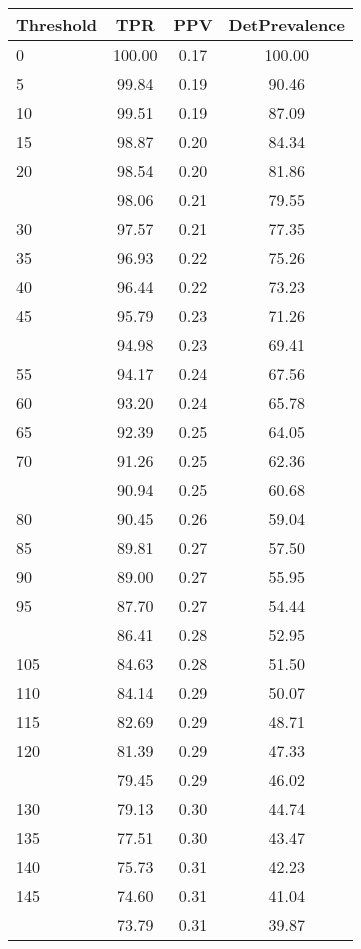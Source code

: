 \begin{table}[ht]
\centering
\begin{tabular}{lccc}
  \toprule
Threshold & TPR & PPV & DetPrevalence \\ 
  \midrule
0 & 100.00 & 0.17 & 100.00 \\ 
  5 & 99.84 & 0.19 & 90.46 \\ 
  10 & 99.51 & 0.19 & 87.09 \\ 
  15 & 98.87 & 0.20 & 84.34 \\ 
  20 & 98.54 & 0.20 & 81.86 \\ 
   \addlinespace
25 & 98.06 & 0.21 & 79.55 \\ 
  30 & 97.57 & 0.21 & 77.35 \\ 
  35 & 96.93 & 0.22 & 75.26 \\ 
  40 & 96.44 & 0.22 & 73.23 \\ 
  45 & 95.79 & 0.23 & 71.26 \\ 
   \addlinespace
50 & 94.98 & 0.23 & 69.41 \\ 
  55 & 94.17 & 0.24 & 67.56 \\ 
  60 & 93.20 & 0.24 & 65.78 \\ 
  65 & 92.39 & 0.25 & 64.05 \\ 
  70 & 91.26 & 0.25 & 62.36 \\ 
   \addlinespace
75 & 90.94 & 0.25 & 60.68 \\ 
  80 & 90.45 & 0.26 & 59.04 \\ 
  85 & 89.81 & 0.27 & 57.50 \\ 
  90 & 89.00 & 0.27 & 55.95 \\ 
  95 & 87.70 & 0.27 & 54.44 \\ 
   \addlinespace
100 & 86.41 & 0.28 & 52.95 \\ 
  105 & 84.63 & 0.28 & 51.50 \\ 
  110 & 84.14 & 0.29 & 50.07 \\ 
  115 & 82.69 & 0.29 & 48.71 \\ 
  120 & 81.39 & 0.29 & 47.33 \\ 
   \addlinespace
125 & 79.45 & 0.29 & 46.02 \\ 
  130 & 79.13 & 0.30 & 44.74 \\ 
  135 & 77.51 & 0.30 & 43.47 \\ 
  140 & 75.73 & 0.31 & 42.23 \\ 
  145 & 74.60 & 0.31 & 41.04 \\ 
   \addlinespace
150 & 73.79 & 0.31 & 39.87 \\ 

\end{tabular}
\end{table}
